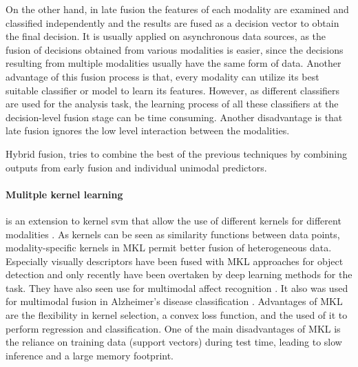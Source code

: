 On the other hand, in late fusion the features of each modality are examined and classified independently and the results are fused as a decision vector to obtain the final decision. It is usually applied on asynchronous data sources, as the fusion of decisions obtained from various modalities is easier, since the decisions resulting from multiple modalities usually have the same form of data. Another advantage of this fusion process is that, every modality can utilize its best suitable classifier or model to learn its features. However, as different classifiers are used for the analysis task, the learning process of all these classifiers at the decision-level fusion stage can be time consuming. Another disadvantage is that late fusion ignores
the low level interaction between the modalities. 

Hybrid fusion, tries to combine the best of the previous techniques by combining outputs from early fusion and individual unimodal predictors.

\paragraph{Mulitple kernel learning} is an extension to kernel \gls{svm} that allow the
use of different kernels for different modalities \cite{Gonen2011multiple}. As kernels can be seen as similarity functions between
data points, modality-specific kernels in MKL permit better fusion of heterogeneous data.
Especially visually descriptors have been fused with MKL approaches for object detection and only recently have been overtaken by deep
learning methods for the task. They have also seen
use for multimodal affect recognition \cite{Chen2014emotion}. It also was used for multimodal fusion in Alzheimer’s disease classification \cite{Liu2014multiple}. 
Advantages of MKL are the flexibility in kernel selection, a convex loss function, and the used of it to perform regression and classification. One of the main disadvantages of MKL is the reliance on training data (support vectors) during test time, leading to slow inference and a large memory footprint.






